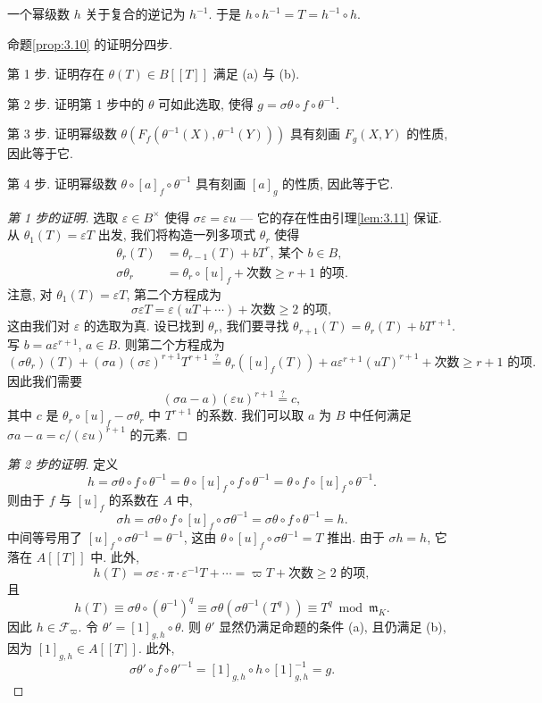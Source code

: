 一个幂级数 $h$ 关于复合的逆记为 $h^{-1}$. 于是 $h\circ h^{-1}=T=h^{-1}\circ h$.

命题\ref{prop:3.10} 的证明分四步.

第 1 步. 证明存在 $\theta(T)\in B[[T]]$ 满足 (a) 与 (b).

第 2 步. 证明第 1 步中的 $\theta$ 可如此选取, 使得 $g=\sigma\theta\circ f\circ\theta^{-1}$.

第 3 步. 证明幂级数 $\theta(F_f(\theta^{-1}(X),\theta^{-1}(Y)))$ 具有刻画 $F_g(X,Y)$ 的性质, 因此等于它.

第 4 步. 证明幂级数 $\theta\circ[a]_f\circ\theta^{-1}$ 具有刻画 $[a]_g$ 的性质, 因此等于它.

\begin{proof}[第 1 步的证明]
选取 $\varepsilon\in B^{\times}$ 使得 $\sigma\varepsilon=\varepsilon u$ — 它的存在性由引理\ref{lem:3.11} 保证. 从 $\theta_1(T)=\varepsilon T$ 出发, 我们将构造一列多项式 $\theta_r$ 使得
\[
\begin{aligned}
\theta_r(T)&=\theta_{r-1}(T)+bT^r,\ \text{某个 }b\in B,\\
\sigma\theta_r&=\theta_r\circ[u]_f+\text{次数}\ge r+1\text{ 的项}.
\end{aligned}
\]
注意, 对 $\theta_1(T)=\varepsilon T$, 第二个方程成为
\[
\sigma\varepsilon T=\varepsilon(uT+\cdots)+\text{次数}\ge 2\text{ 的项},
\]
这由我们对 $\varepsilon$ 的选取为真. 设已找到 $\theta_r$, 我们要寻找 $\theta_{r+1}(T)=\theta_r(T)+bT^{r+1}$. 写 $b=a\varepsilon^{r+1}$, $a\in B$. 则第二个方程成为
\[
(\sigma\theta_r)(T)+(\sigma a)(\sigma\varepsilon)^{r+1}T^{r+1}\stackrel{?}{=}\theta_r([u]_f(T))+a\varepsilon^{r+1}(uT)^{r+1}+\text{次数}\ge r+1\text{ 的项}.
\]
因此我们需要
\[
(\sigma a-a)(\varepsilon u)^{r+1}\stackrel{?}{=}c,
\]
其中 $c$ 是 $\theta_r\circ[u]_f-\sigma\theta_r$ 中 $T^{r+1}$ 的系数. 我们可以取 $a$ 为 $B$ 中任何满足 $\sigma a-a=c/(\varepsilon u)^{r+1}$ 的元素.
\end{proof}

\begin{proof}[第 2 步的证明]
定义
\[
h=\sigma\theta\circ f\circ\theta^{-1}=\theta\circ[u]_f\circ f\circ\theta^{-1}=\theta\circ f\circ[u]_f\circ\theta^{-1}.
\]
则由于 $f$ 与 $[u]_f$ 的系数在 $A$ 中,
\[
\sigma h=\sigma\theta\circ f\circ[u]_f\circ\sigma\theta^{-1}=\sigma\theta\circ f\circ\theta^{-1}=h.
\]
中间等号用了 $[u]_f\circ\sigma\theta^{-1}=\theta^{-1}$, 这由 $\theta\circ[u]_f\circ\sigma\theta^{-1}=T$ 推出. 由于 $\sigma h=h$, 它落在 $A[[T]]$ 中. 此外,
\[
h(T)=\sigma\varepsilon\cdot\pi\cdot\varepsilon^{-1}T+\cdots=\varpi T+\text{次数}\ge 2\text{ 的项},
\]
且
\[
h(T)\equiv\sigma\theta\circ(\theta^{-1})^q\equiv\sigma\theta(\sigma\theta^{-1}(T^q))\equiv T^q\bmod\mathfrak{m}_K.
\]
因此 $h\in\mathcal{F}_{\varpi}$. 令 $\theta'=[1]_{g,h}\circ\theta$. 则 $\theta'$ 显然仍满足命题的条件 (a), 且仍满足 (b), 因为 $[1]_{g,h}\in A[[T]]$. 此外,
\[
\sigma\theta'\circ f\circ\theta'^{-1}=[1]_{g,h}\circ h\circ[1]_{g,h}^{-1}=g.
\]
\end{proof}

